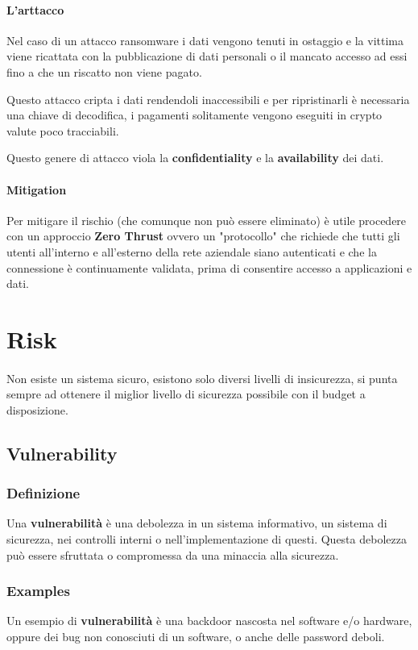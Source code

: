         \paragraph{L'arttacco}
            Nel caso di un attacco ransomware i dati vengono tenuti in ostaggio e la vittima viene ricattata con la pubblicazione di dati personali o il mancato accesso ad essi fino a che un riscatto non viene pagato.

            Questo attacco cripta i dati rendendoli inaccessibili e per ripristinarli è necessaria una chiave di decodifica, i pagamenti solitamente vengono eseguiti in crypto valute poco tracciabili.

            Questo genere di attacco viola la \textbf{confidentiality} e la \textbf{availability} dei dati.
        \paragraph{Mitigation}
            Per mitigare il rischio (che comunque non può essere eliminato) è utile procedere con un approccio \textbf{Zero Thrust} ovvero un "protocollo" che richiede che tutti gli utenti all'interno e all'esterno della rete aziendale siano autenticati e che la connessione è continuamente validata, prima di consentire accesso a applicazioni e dati.

\section{Risk}
    \paragraph{} Non esiste un sistema sicuro, esistono solo diversi livelli di insicurezza, si punta sempre ad ottenere il miglior livello di sicurezza possibile con il budget a disposizione.
    \subsection{Vulnerability}
        \subsubsection{Definizione}
            Una \textbf{vulnerabilità} è una debolezza in un sistema informativo, un sistema di sicurezza, nei controlli interni o nell'implementazione di questi. Questa debolezza può essere sfruttata o compromessa da una minaccia alla sicurezza.
        \subsubsection{Examples}
            Un esempio di \textbf{vulnerabilità} è una backdoor nascosta nel software e/o hardware, oppure dei bug non conosciuti di un software, o anche delle password deboli.
